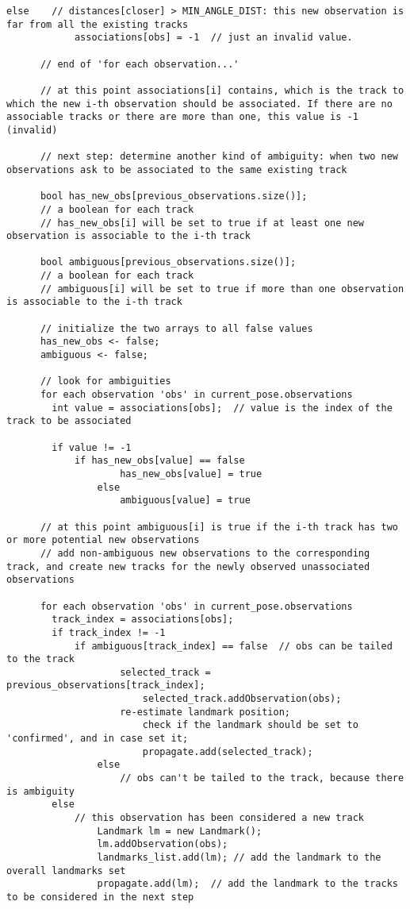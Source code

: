 {\begin{lstlisting}[frame=shadowbox,breaklines]
        else	// distances[closer] > MIN_ANGLE_DIST: this new observation is far from all the existing tracks
        	associations[obs] = -1	// just an invalid value.
      
      // end of 'for each observation...'
      
      // at this point associations[i] contains, which is the track to which the new i-th observation should be associated. If there are no associable tracks or there are more than one, this value is -1 (invalid)
      
      // next step: determine another kind of ambiguity: when two new observations ask to be associated to the same existing track
      
      bool has_new_obs[previous_observations.size()];
      // a boolean for each track
      // has_new_obs[i] will be set to true if at least one new observation is associable to the i-th track
      
      bool ambiguous[previous_observations.size()];
      // a boolean for each track
      // ambiguous[i] will be set to true if more than one observation is associable to the i-th track
      
      // initialize the two arrays to all false values
      has_new_obs <- false;
      ambiguous <- false;
      
      // look for ambiguities
      for each observation 'obs' in current_pose.observations
      	int value = associations[obs];	// value is the index of the track to be associated
        
        if value != -1
        	if has_new_obs[value] == false
                	has_new_obs[value] = true
                else
                	ambiguous[value] = true
                        
      // at this point ambiguous[i] is true if the i-th track has two or more potential new observations
      // add non-ambiguous new observations to the corresponding track, and create new tracks for the newly observed unassociated observations
      
      for each observation 'obs' in current_pose.observations
      	track_index = associations[obs];
      	if track_index != -1
        	if ambiguous[track_index] == false	// obs can be tailed to the track
        	        selected_track = previous_observations[track_index];
                        selected_track.addObservation(obs);
                	re-estimate landmark position;
                        check if the landmark should be set to 'confirmed', and in case set it;
                        propagate.add(selected_track);
                else
                	// obs can't be tailed to the track, because there is ambiguity
        else
        	// this observation has been considered a new track
                Landmark lm = new Landmark();
                lm.addObservation(obs);
                landmarks_list.add(lm);	// add the landmark to the overall landmarks set
                propagate.add(lm);	// add the landmark to the tracks to be considered in the next step
    

\end{lstlisting}}
